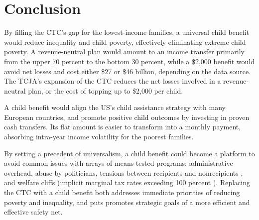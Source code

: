 \documentclass[12pt]{article}
\begin{document}
\section{Conclusion} \label{sec:conclusion}

By filling the CTC's gap for the lowest-income families, a universal child benefit would reduce inequality and child poverty, effectively eliminating extreme child poverty. A revenue-neutral plan would amount to an income transfer primarily from the upper 70 percent to the bottom 30 percent, while a \$2,000 benefit would avoid net losses and cost either \$27 or \$46 billion, depending on the data source. The TCJA's expansion of the CTC reduces the net losses involved in a revenue-neutral plan, or the cost of topping up to \$2,000 per child.

A child benefit would align the US's child assistance strategy with many European countries, and promote positive child outcomes by investing in proven cash transfers. Its flat amount is easier to transform into a monthly payment, absorbing intra-year income volatility for the poorest families.


By setting a precedent of universalism, a child benefit could become a platform to avoid common issues with arrays of means-tested programs: administrative overhead, abuse by politicians, tensions between recipients and nonrecipients \cite{desai2017rethinking}, and welfare cliffs (implicit marginal tax rates exceeding 100 percent \cite{senate2012cliff}). Replacing the CTC with a child benefit both addresses immediate priorities of reducing poverty and inequality, and puts promotes strategic goals of a more efficient and effective safety net.


\clearpage

\singlespacing
\end{document}
